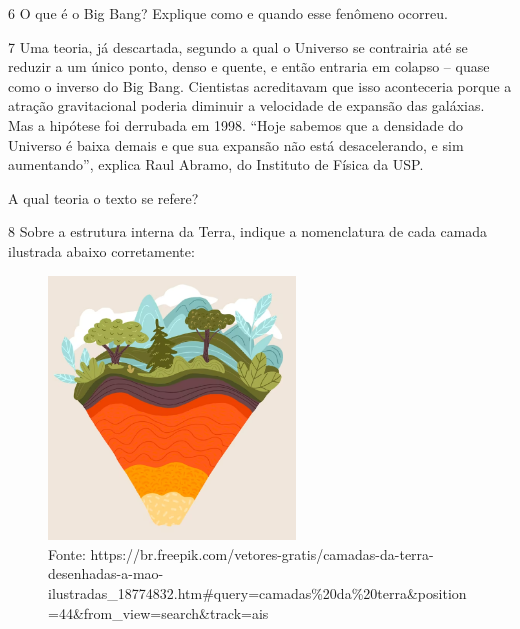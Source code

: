 {{\num{6}  O que é o Big Bang? Explique como e quando esse fenômeno ocorreu.



\num{7}  Uma teoria, já descartada, segundo a qual o Universo se contrairia até
  se reduzir a um único ponto, denso e quente, e então entraria em
  colapso -- quase como o inverso do Big Bang. Cientistas acreditavam
  que isso aconteceria porque a atração gravitacional poderia diminuir a
  velocidade de expansão das galáxias. Mas a hipótese foi derrubada em
  1998. ``Hoje sabemos que a densidade do Universo é baixa demais e que
  sua expansão não está desacelerando, e sim aumentando'', explica Raul
  Abramo, do Instituto de Física da USP.


A qual teoria o texto se refere?



\num{8} Sobre a estrutura interna da Terra, indique a nomenclatura de cada camada ilustrada abaixo corretamente:

\begin{figure}[htpb!]
\includegraphics[width=2.58803in,height=2.75652in]{./imgs/img11.png}
\caption{Fonte: https://br.freepik.com/vetores-gratis/camadas-da-terra-desenhadas-a-mao-ilustradas\_18774832.htm\#query=camadas\%20da\%20terra\&position=44\&from\_view=search\&track=ais}
\end{figure}


}}
